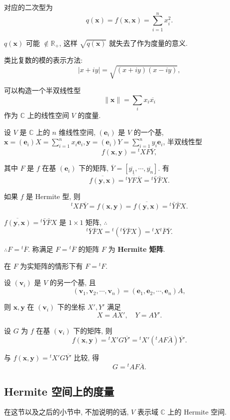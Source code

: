 \documentclass{ctexart}
\begin{document}
对应的二次型为
\[q(\boldsymbol{x})=f(\boldsymbol{x},\boldsymbol{x})=\sum\limits_{i=1}^nx_i^2.\]

$q(\boldsymbol{x})$ 可能 $\notin\mathbb{R}_+$, 这样 $\sqrt{q(\boldsymbol{x})}$ 就失去了作为度量的意义.

类比复数的模的表示方法:
\[|x+iy|=\sqrt{(x+iy)(x-iy)},\]

可以构造一个半双线性型
\[\|\boldsymbol{x}\|=\sum\limits_ix_i\overline{x_i}\]
作为 $\mathbb{C}$ 上的线性空间 $V$ 的度量.

设 $V$ 是 $\mathbb{C}$ 上的 $n$ 维线性空间, $(\boldsymbol{e}_i)$ 是 $V$ 的一个基, $\boldsymbol{x}=(\boldsymbol{e}_i)X=\sum\limits_{i=1}^nx_i\boldsymbol{e}_i,\boldsymbol{y}=(\boldsymbol{e}_i)Y=\sum\limits_{i=1}^ny_i\boldsymbol{e}_i$, 半双线性型
\[f(\boldsymbol{x},\boldsymbol{y})={}^tXF\overline{Y},\]

其中 $F$ 是 $f$ 在基 $(\boldsymbol{e}_i)$ 下的矩阵, $\overline{Y}=[\overline{y_1},\cdots,\overline{y_n}]$. 有
\[\overline{f(\boldsymbol{y},\boldsymbol{x})}=\overline{{}^tYF\overline{X}}={}^t\bar{Y}\bar{F}X.\]

如果 $f$ 是 Hermite 型, 则
\[{}^tXF\overline{Y}=f(\boldsymbol{x},\boldsymbol{y})=\overline{f(\boldsymbol{y},\boldsymbol{x})}={}^t\bar{Y}\bar{F}X.\]

$\overline{f(\boldsymbol{y},\boldsymbol{x})}={}^t\bar{Y}\bar{F}X$ 是 $1\times 1$ 矩阵, $\therefore$
\[{}^t\bar{Y}\bar{F}X={}^t({}^t\bar{Y}\bar{F}X)={}^tX{}^t\bar{F}\bar{Y}.\]

$\therefore F={}^t\overline{F}$. 称满足 $F={}^t\overline{F}$ 的矩阵 $F$ 为 \textbf{Hermite 矩阵}.

在 $F$ 为实矩阵的情形下有 $F={}^tF$.

设 $(\boldsymbol{v}_i)$ 是 $V$ 的另一个基, 且
\[(\boldsymbol{v}_1,\boldsymbol{v}_2,\cdots,\boldsymbol{v}_n)=(\boldsymbol{e}_1,\boldsymbol{e}_2,\cdots,\boldsymbol{e}_n)A,\]

则 $\boldsymbol{x},\boldsymbol{y}$ 在 $(\boldsymbol{v}_i)$ 下的坐标 $X',Y'$ 满足
\[X=AX',\quad Y=AY'.\]

设 $G$ 为 $f$ 在基 $(\boldsymbol{v}_i)$ 下的矩阵, 则
\[f(\boldsymbol{x},\boldsymbol{y})={}^tX'G\overline{Y'}={}^tX'({}^tAF\bar{A})\overline{Y'}.\]

与 $f(\boldsymbol{x},\boldsymbol{y})={}^tX'G\overline{Y'}$ 比较, 得
\begin{equation}\label{eq2.1}
    G={}^tAF\overline{A}.
\end{equation}
\subsection{Hermite 空间上的度量}
在这节以及之后的小节中, 不加说明的话, $V$ 表示域 $\mathbb{C}$ 上的 Hermite 空间.
\end{document}
